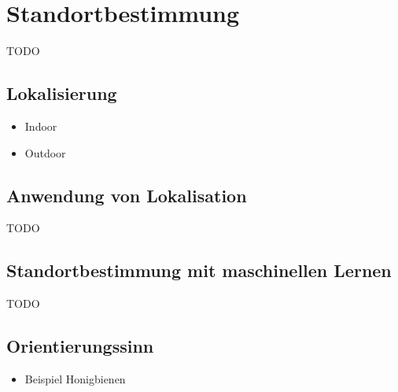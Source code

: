 \chapter{Standortbestimmung}
TODO

\section{Lokalisierung}
\begin{itemize}
    \item Indoor
    \item Outdoor
\end{itemize}

\section{Anwendung von Lokalisation}
TODO

\section{Standortbestimmung mit maschinellen Lernen}
TODO

\section{Orientierungssinn}
\begin{itemize}
    \item Beispiel Honigbienen
\end{itemize}
